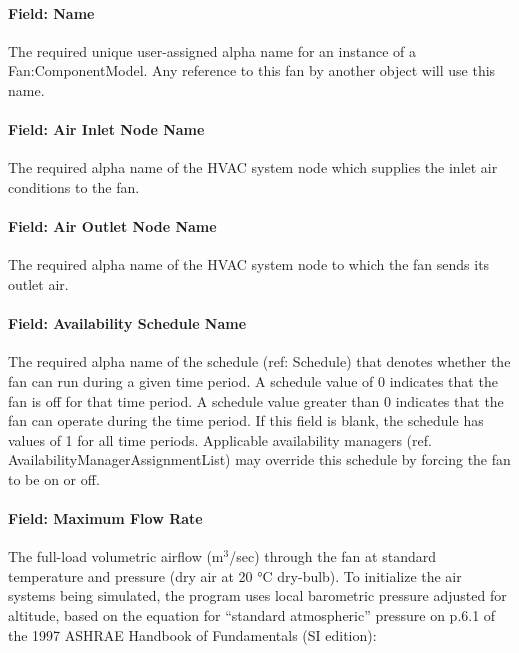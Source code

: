 \paragraph{Field: Name}\label{field-name-4-011}

The required unique user-assigned alpha name for an instance of a Fan:ComponentModel. Any reference to this fan by another object will use this name.

\paragraph{Field: Air Inlet Node Name}\label{field-air-inlet-node-name-4-000}

The required alpha name of the HVAC system node which supplies the inlet air conditions to the fan.

\paragraph{Field: Air Outlet Node Name}\label{field-air-outlet-node-name-4-000}

The required alpha name of the HVAC system node to which the fan sends its outlet air.

\paragraph{Field: Availability Schedule Name}\label{field-availability-schedule-name-4-002}

The required alpha name of the schedule (ref: Schedule) that denotes whether the fan can run during a given time period. A schedule value of 0 indicates that the fan is off for that time period. A schedule value greater than 0 indicates that the fan can operate during the time period. If this field is blank, the schedule has values of 1 for all time periods. Applicable availability managers (ref. AvailabilityManagerAssignmentList) may override this schedule by forcing the fan to be on or off.

\paragraph{Field: Maximum Flow Rate}\label{field-maximum-flow-rate-5}

The full-load volumetric airflow (m\(^{3}\)/sec) through the fan at standard temperature and pressure (dry air at 20 °C dry-bulb). To initialize the air systems being simulated, the program uses local barometric pressure adjusted for altitude, based on the equation for ``standard atmospheric'' pressure on p.6.1 of the 1997 ASHRAE Handbook of Fundamentals (SI edition):

